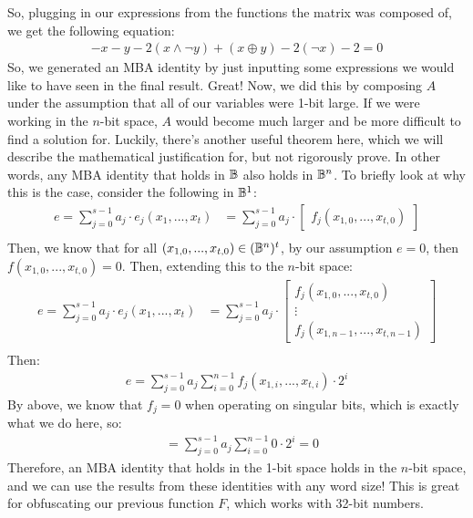 So, plugging in our expressions from the functions the matrix was composed of, 
we get the following equation:
\begin{align*}
    - x - y - 2(x \land \neg y) + (x \oplus y) - 2(\neg x) - 2 = 0
\end{align*}
So, we generated an MBA identity by just inputting some expressions we would like to 
have seen in the final result. Great! Now, we did this by composing $A$ under the 
assumption that all of our variables were 1-bit large. If we were working in the $n$-bit
space, $A$ would become much larger and be more difficult to find a solution for. 
Luckily, there's another useful theorem here, which
we will describe the mathematical justification for, but not rigorously prove.
In other words, any MBA identity that holds in $\mathbb{B}$ also holds in $\mathbb{B}^n$.
To briefly look at why this is the case, consider the following in $\mathbb{B}^1$:
\begin{align*}
    e = \sum_{j=0}^{s-1}a_j \cdot e_j(x_1, ..., x_t) &= \sum_{j=0}^{s-1} a_j \cdot \begin{bmatrix}
    f_j(x_{1, 0}, ..., x_{t, 0})
    \end{bmatrix}\\
\end{align*}
Then, we know that for all $(x_{1,0}, ..., x_{t,0}) \in (\mathbb{B}^n)^t$, by our assumption $e = 0$, 
then $f(x_{1,0}, ..., x_{t, 0}) = 0$. Then, extending this to the $n$-bit space:
\begin{align*}
    e = \sum_{j=0}^{s-1}a_j \cdot e_j(x_1, ..., x_t) &= \sum_{j=0}^{s-1} a_j \cdot \begin{bmatrix}
    f_j(x_{1,0}, ..., x_{t, 0})\\
    \vdots \\
    f_j(x_{1,n-1}, ..., x_{t, n-1})
    \end{bmatrix}\\
\end{align*}
Then:
\begin{align*}
    e =  \sum_{j=0}^{s-1} a_j \sum_{i=0}^{n-1} f_j(x_{1,i}, ..., x_{t, i}) \cdot 2^{i}
\end{align*}
By above, we know that $f_j = 0$ when operating on singular bits, which is exactly what
we do here, so:
\begin{align*}
    &= \sum_{j=0}^{s-1} a_j \sum_{i=0}^{n-1} 0 \cdot 2^{i} = 0
\end{align*}
Therefore, an MBA identity that holds in the 1-bit space holds in the $n$-bit space, 
and we can use the results from these identities with any word size! This is 
great for obfuscating our previous function $F$, which works with 32-bit numbers.
